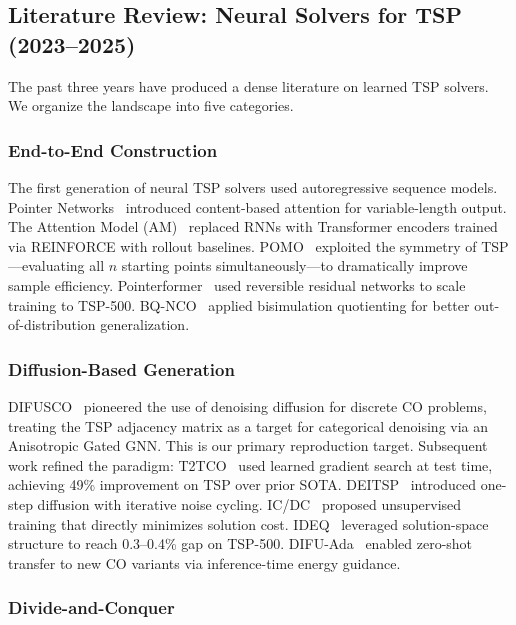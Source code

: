 \documentclass[11pt,a4paper]{article}
\begin{document}
\subsection{Literature Review: Neural Solvers for TSP (2023--2025)}

The past three years have produced a dense literature on learned TSP solvers. We organize the landscape into five categories.

\subsubsection{End-to-End Construction}

The first generation of neural TSP solvers used autoregressive sequence models. Pointer Networks~\cite{vinyals2015} introduced content-based attention for variable-length output. The Attention Model (AM)~\cite{kool2019} replaced RNNs with Transformer encoders trained via REINFORCE with rollout baselines. POMO~\cite{kwon2020} exploited the symmetry of TSP---evaluating all $n$ starting points simultaneously---to dramatically improve sample efficiency. Pointerformer~\cite{jin2023} used reversible residual networks to scale training to TSP-500. BQ-NCO~\cite{drakulic2023} applied bisimulation quotienting for better out-of-distribution generalization.

\subsubsection{Diffusion-Based Generation}

DIFUSCO~\cite{sun2023} pioneered the use of denoising diffusion for discrete CO problems, treating the TSP adjacency matrix as a target for categorical denoising via an Anisotropic Gated GNN. This is our primary reproduction target. Subsequent work refined the paradigm: T2TCO~\cite{li2024t2t} used learned gradient search at test time, achieving 49\% improvement on TSP over prior SOTA. DEITSP~\cite{zhou2025deitsp} introduced one-step diffusion with iterative noise cycling. IC/DC~\cite{huang2025} proposed unsupervised training that directly minimizes solution cost. IDEQ~\cite{basson2025} leveraged solution-space structure to reach 0.3--0.4\% gap on TSP-500. DIFU-Ada~\cite{lei2025} enabled zero-shot transfer to new CO variants via inference-time energy guidance.

\subsubsection{Divide-and-Conquer}
\end{document}
